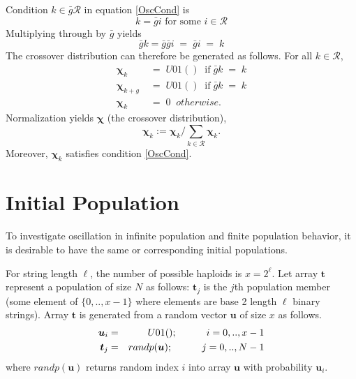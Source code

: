 Condition $k \in \bar{g} \mathcal{R}$ in equation \ref{OscCond} is
\[
k = \bar{g} i  \text{ for some $i \in \mathcal{R}$}
\]
Multiplying through by $\bar{g}$ yields
\begin{equation*}
\bar{g} k = \bar{g} \bar{g} i \; = \; \bar{g} i \; = \; k 
\end{equation*}
The crossover distribution can therefore be generated as follows.
For all $k \in \mathcal{R}$,
\begin{equation}
\label{ChiDist}
\begin{split}
\bm{\chi}_k & \;=\;  U01() \;\; \mbox{if}\; \bar{g}k \;=\; k \\
\bm{\chi}_{k+g} & \;=\;  U01() \;\; \mbox{if}\; \bar{g}k \;=\; k\\
\bm{\chi}_k & \;=\;  0  \;\; otherwise.
\end{split}
\end{equation} 
Normalization yields 
$\bm{\chi}$ (the crossover distribution),
\[
\bm{\chi}_k := \bm{\chi}_k/\sum\limits_{k \in \mathcal{R}} \bm{\chi}_k.
\]
Moreover, $\bm{\chi}_k$ satisfies condition \ref{OscCond}.

\section{Initial Population}
\label{InitPopOsc}

To investigate oscillation in infinite population and finite population behavior, 
it is desirable to have the same or corresponding initial populations. 

For string length $\ell$, the number of possible haploids is $x = 2^\ell$. Let array $\bm{t}$ represent a  
population of size $N$ as follows: $\bm{t}_j$ is the $j$th population member (some element of $\{0,..,x-1\}$ 
where elements are base 2 length $\ell$ binary strings). Array $\bm{t}$ is generated from a random vector $\bm{u}$ of size $x$ as follows. 
\begin{eqnarray*}
\bm{u}_i & = & U01(); \hspace{30pt} {i = 0,.., x-1} \\
\bm{t}_j & = & randp(\bm{u}) ; \hspace{30pt} {j = 0,.., N-1}
\end{eqnarray*}
where $randp(\bm{u})$ returns random index $i$ into array $\bm{u}$ with probability $\bm{u}_i$.

